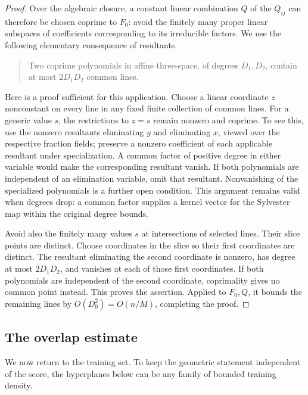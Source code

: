 \begin{proof}
Over the algebraic closure, a constant linear combination $Q$ of the
$Q_{ij}$ can therefore be chosen coprime to $F_0$: avoid the finitely many
proper linear subspaces of coefficients corresponding to its irreducible
factors.  We use the following elementary consequence of resultants.
\begin{quote}
Two coprime polynomials in affine three-space, of degrees $D_1,D_2$,
contain at most $2D_1D_2$ common lines.
\end{quote}
Here is a proof sufficient for this application.  Choose a linear
coordinate $z$ nonconstant on every line in any fixed finite collection
of common lines.  For a generic value $s$, the restrictions to $z=s$
remain nonzero and coprime.  To see this, use the nonzero resultants
eliminating $y$ and eliminating $x$, viewed over the respective fraction
fields; preserve a nonzero coefficient of each applicable resultant
under specialization.  A common factor of positive degree in either
variable would make the corresponding resultant vanish.  If both
polynomials are independent of an elimination variable, omit that
resultant.  Nonvanishing of the specialized polynomials is a further
open condition.  This argument remains valid when degrees drop: a common
factor supplies a kernel vector for the Sylvester map within the original
degree bounds.

Avoid also the finitely many values $s$ at intersections of selected
lines.  Their slice points are distinct.  Choose coordinates in the slice
so their first coordinates are distinct.  The resultant eliminating the
second coordinate is nonzero, has degree at most $2D_1D_2$, and vanishes
at each of those first coordinates.  If both polynomials are independent
of the second coordinate, coprimality gives no common point instead.
This proves the assertion.  Applied to $F_0,Q$, it bounds the remaining
lines by $O(D_0^2)=O(n/M)$, completing the proof.
\end{proof}

\subsection{The overlap estimate}

We now return to the training set.  To keep the geometric statement
independent of the score, the hyperplanes below can be any family of
bounded training density.


